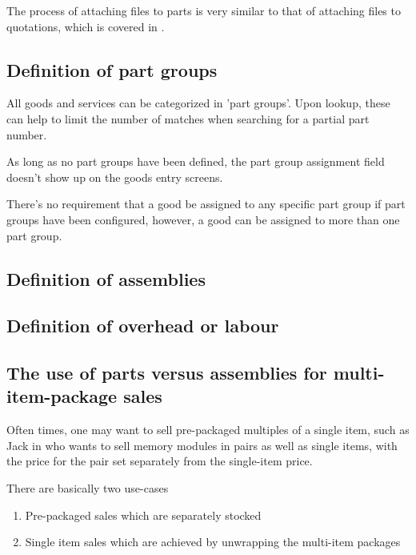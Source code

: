 The process of attaching files to parts is very similar to that of
attaching files to quotations, which is covered in .

\subsection{Definition of part groups}

All goods and services can be categorized in 'part groups'. Upon lookup, these can
help to limit the number of matches when searching for a partial part number.

As long as no part groups have been defined, the part group assignment field doesn't
show up on the goods entry screens.

There's no requirement that a good be assigned to any specific part group if part
groups have been configured, however, a good can be assigned to more than one part group.

\subsection{Definition of assemblies}



\subsection{Definition of overhead or labour}


\subsection{The use of parts versus assemblies for multi-item-package sales}
\label{subsec:parts-vs-assemblies-for-package-sales}

Often times, one may want to sell pre-packaged multiples of a single item, such as Jack
in  who wants to sell memory modules in pairs as well as
single items, with the price for the pair set separately from the single-item price.

There are basically two use-cases

\begin{enumerate}
\item Pre-packaged sales which are separately stocked
\item Single item sales which are achieved by unwrapping the multi-item packages
\end{enumerate}


